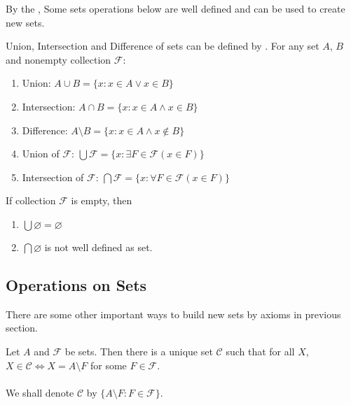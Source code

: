 By the , Some sets operations below are well defined and can be used to create new sets.

\begin{corollary}{}{}
    Union, Intersection and Difference of sets can be defined by . For any set $A$, $B$ and nonempty collection $\mathcal{F}$:\\
    \begin{enumerate}
        \item Union: $A \cup B = \{x: x \in A \lor x \in B\} $ 
        \item Intersection: $A \cap B = \{x: x \in A \land x \in B\}$
        \item Difference: $A \setminus B = \{x: x \in A \land x \notin B\}$
        \item Union of $\mathcal{F}$: $\bigcup \mathcal{F} = \{x: \exists F \in \mathcal{F}(x\in F)\}$
        \item Intersection of $\mathcal{F}$: $\bigcap \mathcal{F} = \{x: \forall F \in \mathcal{F}(x\in F)\}$
    \end{enumerate}
\end{corollary}

\begin{remark}
    If collection $\mathcal{F}$ is empty, then\\
    \begin{enumerate}
        \item $\bigcup \varnothing = \varnothing$ 
        \item $\bigcap \varnothing$ is not well defined as set.
    \end{enumerate}
\end{remark}

\newpage

\subsection{Operations on Sets}

There are some other important ways to build new sets by axioms in previous section.

\begin{lemma}{}{}
    Let $A$ and $\mathcal{F}$ be sets. Then there is a unique set $\mathcal{C}$ such that for all $X$,\\
    $X \in \mathcal{C} \iff X = A \setminus F$ for some $F \in \mathcal{F}$.\\
    \\
    We shall denote $\mathcal{C}$ by $\{A \setminus F: F \in \mathcal{F}\}$.
\end{lemma}

